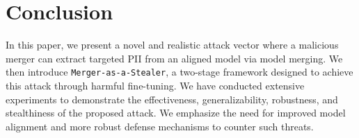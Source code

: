 \section{Conclusion}

In this paper, we present a novel and realistic attack vector where a malicious merger can extract targeted PII from an aligned model via model merging. We then introduce \texttt{Merger-as-a-Stealer}, a two-stage framework designed to achieve this attack through harmful fine-tuning. We have conducted extensive experiments to demonstrate the effectiveness, generalizability, robustness, and stealthiness of the proposed attack. We emphasize the need for improved model alignment and more robust defense mechanisms to counter such threats. 
